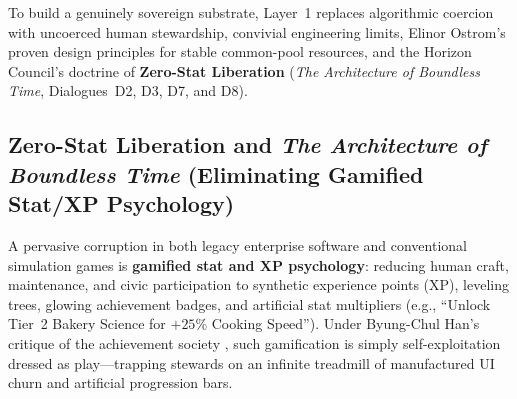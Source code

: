 To build a genuinely sovereign substrate, Layer~1 replaces algorithmic coercion with uncoerced human stewardship, convivial engineering limits, Elinor Ostrom's proven design principles for stable common-pool resources, and the Horizon Council's doctrine of \textbf{Zero-Stat Liberation} (\textit{The Architecture of Boundless Time}, Dialogues~D2, D3, D7, and D8).

\subsection{Zero-Stat Liberation and \textit{The Architecture of Boundless Time} (Eliminating Gamified Stat/XP Psychology)}
\label{subsec:psych_zero_stat_liberation}
A pervasive corruption in both legacy enterprise software and conventional simulation games is \textbf{gamified stat and XP psychology}: reducing human craft, maintenance, and civic participation to synthetic experience points (XP), leveling trees, glowing achievement badges, and artificial stat multipliers (e.g., ``Unlock Tier~2 Bakery Science for $+25\%$ Cooking Speed''). Under Byung-Chul Han's critique of the achievement society \cite{han2015}, such gamification is simply self-exploitation dressed as play---trapping stewards on an infinite treadmill of manufactured UI churn and artificial progression bars.

